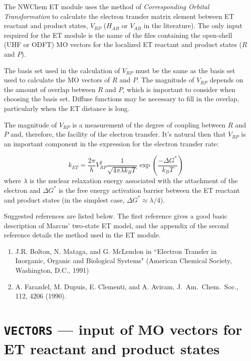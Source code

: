 \label{sec:etrans}

The NWChem ET module uses the method of {\em Corresponding Orbital Transformation} to calculate the
electron transfer matrix element between ET reactant and product states,
$V_{RP}$ ($H_{AB}$ or $V_{AB}$ in the literature). The only input required for the ET module is the
name of the files containing the open-shell (UHF or ODFT) MO vectors for the localized ET reactant and product states ($R$ and $P$).

The basis set used in the calculation of $V_{RP}$ must be the same as the basis set used to calculate the MO vectors of
$R$ and $P$.  The magnitude of $V_{RP}$ depends on the amount of overlap between $R$ and $P$,
which is important to consider when choosing the basis set.  Diffuse functions may be
necessary to fill in the overlap, particularly when the ET distance is long.

The magnitude of $V_{RP}$ is a measurement of the degree of coupling between $R$ and $P$ and,
therefore, the facility of the electron transfer.  It's natural then that $V_{RP}$ is an important component in the expression for
the electron transfer rate: 

\begin{equation} 
{k_{ET}}=
\frac{2\pi}{\hbar}
V_{RP}^{2}
\frac{1}{\sqrt{4\pi \lambda k_{B}T}}
\exp \left( \frac{- \Delta G^{*}}{k_{B} T} \right)
\end{equation}
where $\lambda$ is the nuclear relaxation energy associated with the attachment of the electron and $\Delta G^{*}$ is the
free energy activation barrier between the ET reactant and product states (in the simplest case, $\Delta G^{*} \approx \lambda / 4$).

Suggested references are listed below.  The first reference gives a good basic description 
of Marcus' two-state ET model, and the appendix of the second reference details the method used
in the ET module.

\begin{enumerate}
\item J.R. Bolton, N. Mataga, and G. McLendon in ``Electron Transfer in Inorganic, Organic and Biological Systems"
(American Chemical Society, Washington, D.C., 1991)
\item A. Farazdel, M. Dupuis, E. Clementi, and A. Aviram, 
J.~Am.~Chem.~Soc., 112, 4206 (1990).
\end{enumerate}

\section{{\tt VECTORS} --- input of MO vectors for ET reactant and product states}
\label{sec:etransvectors}


